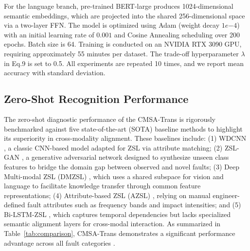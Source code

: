 \documentclass[journal]{IEEEtran}
\begin{document}
For the language branch, pre-trained BERT-large produces 1024-dimensional semantic embeddings, which are projected into the shared 256-dimensional space via a two-layer FFN. The model is optimized using Adam (weight decay $1e{-4}$) with an initial learning rate of $0.001$ and Cosine Annealing scheduling over 200 epochs. Batch size is 64. Training is conducted on an NVIDIA RTX 3090 GPU, requiring approximately 55 minutes per dataset. The trade-off hyperparameter $\lambda$ in Eq.9 is set to 0.5. All experiments are repeated 10 times, and we report mean accuracy with standard deviation.


\subsection{Zero-Shot Recognition Performance}
The zero-shot diagnostic performance of the CMSA-Trans is rigorously benchmarked against five state-of-the-art (SOTA) baseline methods to highlight its superiority in cross-modality alignment. These baselines include: (1) WDCNN \cite{zhang2017new}, a classic CNN-based model adapted for ZSL via attribute matching; (2) ZSL-GAN \cite{xian2019fvaegan}, a generative adversarial network designed to synthesize unseen class features to bridge the domain gap between observed and novel faults; (3) Deep Multi-modal ZSL (DMZSL) \cite{schonfeld2019generalized}, which uses a shared subspace for vision and language to facilitate knowledge transfer through common feature representations; (4) Attribute-based ZSL (AZSL) \cite{lampert2014attribute}, relying on manual engineer-defined fault attributes such as frequency bands and impact intensities; and (5) Bi-LSTM-ZSL \cite{chen2019bearing}, which captures temporal dependencies but lacks specialized semantic alignment layers for cross-modal interaction. As summarized in Table~\ref{tab:comparison}, CMSA-Trans demonstrates a significant performance advantage across all fault categories \cite{li2022zero, lu2017deep}.
\end{document}

